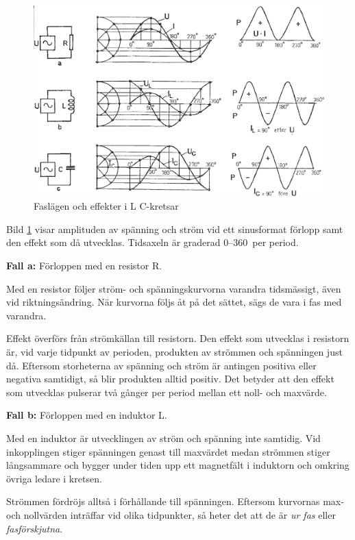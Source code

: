 \begin{figure}
\includegraphics[width=\textwidth]{images/cropped_pdfs/bild_2_3-11.pdf}
\caption{Faslägen och effekter i L C-kretsar}
\label{fig:BildII3-11}
\end{figure}

Bild \ref{fig:BildII3-11} visar amplituden av spänning och ström vid ett
sinusformat förlopp samt den effekt som då utvecklas.
Tidsaxeln är graderad 0--360\degree~per period.

\noindent \textbf{Fall a:} Förloppen med en resistor R.

Med en resistor följer ström- och spänningskurvorna varandra tidsmässigt, även
vid riktningsändring.
När kurvorna följs åt på det sättet, sägs de vara i fas med varandra.

Effekt överförs från strömkällan till resistorn.
Den effekt som utvecklas i resistorn är, vid varje tidpunkt av perioden,
produkten av strömmen och spänningen just då.
Eftersom storheterna av spänning och ström är antingen positiva eller negativa
samtidigt, så blir produkten alltid positiv.
Det betyder att den effekt som utvecklas pulserar två gånger per period mellan
ett noll- och maxvärde.

\noindent \textbf{Fall b:} Förloppen med en induktor L.

Med en induktor är utvecklingen av ström och spänning inte samtidig.
Vid inkopplingen stiger spänningen genast till maxvärdet medan strömmen stiger
långsammare och bygger under tiden upp ett magnetfält i induktorn och omkring
övriga ledare i kretsen.

Strömmen fördröjs alltså i förhållande till spänningen.
Eftersom kurvornas max- och nollvärden inträffar vid olika tidpunkter, så heter
det att de är \emph{ur fas} eller \emph{fasförskjutna}.

